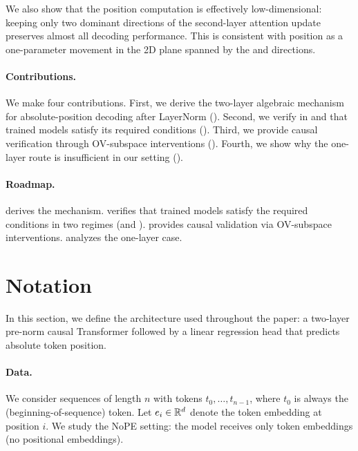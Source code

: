 \documentclass{article}
\theoremstyle{plain}
\theoremstyle{definition}
\theoremstyle{remark}
\begin{document}
We also show that the position computation is effectively low-dimensional: keeping only two dominant directions of the second-layer attention update preserves almost all decoding performance. This is consistent with position as a one-parameter movement in the 2D plane spanned by the \bos and \nbos directions.

\paragraph{Contributions.}
We make four contributions. First, we derive the two-layer algebraic mechanism for absolute-position decoding after LayerNorm (). Second, we verify in \modelminimal and \modelfull that trained models satisfy its required conditions (). Third, we provide causal verification through OV-subspace interventions (). Fourth, we show why the one-layer route is insufficient in our setting ().

\paragraph{Roadmap.}
 derives the mechanism.  verifies that trained models satisfy the required conditions in two regimes (\modelminimal and \modelfull).  provides causal validation via OV-subspace interventions.  analyzes the one-layer case.

\section{Notation}
\label{sec:notation}
In this section, we define the architecture used throughout the paper: a two-layer pre-norm causal Transformer
\citep{vaswani2017attention, radford2019language, Baevski2018AdaptiveIR, Xiong2020OnLN} followed by a linear
regression head that predicts absolute token position.

\paragraph{Data.}
We consider sequences of length $n$ with tokens $t_0,\dots,t_{n-1}$, where $t_0$ is always the \bos (beginning-of-sequence) token.
Let $e_i \in \mathbb{R}^d$ denote the token embedding at position $i$.
We study the NoPE setting: the model receives only token embeddings (no positional embeddings).
\end{document}
